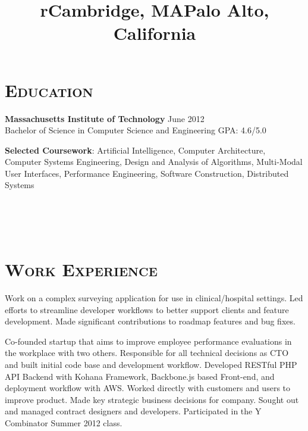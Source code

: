 \begin{resume}


\section{\textsc{Education}}

\textbf{Massachusetts Institute of Technology} \hfill{June 2012}\\
Bachelor of Science in Computer Science and Engineering \hfill{GPA: 4.6/5.0} 

\textbf{Selected Coursework}: Artificial Intelligence, Computer Architecture, Computer Systems Engineering, Design and Analysis of Algorithms, Multi-Modal User Interfaces, Performance Engineering, Software Construction, Distributed Systems



\begin{formatb}
  \title{r}\\
  \\
  \body\\
\end{formatb}

\section{\textsc{Work Experience}}

\title{Cambridge, MA}
\begin{position}
Work on a complex surveying application for use in clinical/hospital settings. Led efforts to streamline developer workflows to better support clients and feature development. Made significant contributions to roadmap features and bug fixes.
\end{position}

\title{Palo Alto, California}
\begin{position}
Co-founded startup that aims to improve employee performance evaluations in the workplace with two others. Responsible for all technical decisions as CTO and built initial code base and development workflow. Developed RESTful PHP API Backend with Kohana Framework, Backbone.js based Front-end, and deployment workflow with AWS. Worked directly with customers and users to improve product. Made key strategic business decisions for company. Sought out and managed contract designers and developers. Participated in the Y Combinator Summer 2012 class.
\end{position}


\end{resume}
